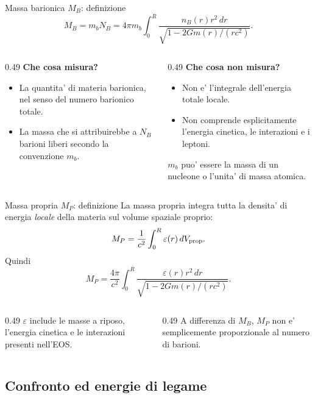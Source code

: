 \begin{frame}{Massa barionica $M_B$: definizione}
\small
\[
M_B=m_bN_B
=4\pi m_b\int_0^R
\frac{n_B(r)r^2\,dr}
{\sqrt{1-2Gm(r)/(rc^2)}}.
\]
\begin{columns}[T,onlytextwidth]
\begin{column}{0.49\textwidth}
\textbf{Che cosa misura?}
\begin{itemize}
\item La quantita' di materia barionica,
nel senso del numero barionico totale.
\item La massa che si attribuirebbe a $N_B$
barioni liberi secondo la convenzione $m_b$.
\end{itemize}
\end{column}
\begin{column}{0.49\textwidth}
\textbf{Che cosa non misura?}
\begin{itemize}
\item Non e' l'integrale dell'energia totale locale.
\item Non comprende esplicitamente
l'energia cinetica, le interazioni e i leptoni.
\end{itemize}
\medskip
$m_b$ puo' essere la massa di un nucleone
o l'unita' di massa atomica.
\end{column}
\end{columns}
\end{frame}

\begin{frame}{Massa propria $M_P$: definizione}
\small
La massa propria integra tutta la densita' di energia
\emph{locale} della materia sul volume spaziale proprio:
\[
M_P=\frac{1}{c^2}\int_0^R\varepsilon(r)\,dV_{\rm prop}.
\]
Quindi
\[
M_P=\frac{4\pi}{c^2}\int_0^R
\frac{\varepsilon(r)r^2\,dr}
{\sqrt{1-2Gm(r)/(rc^2)}}.
\]
\begin{columns}[T,onlytextwidth]
\begin{column}{0.49\textwidth}
$\varepsilon$ include le masse a riposo,
l'energia cinetica e le interazioni
presenti nell'EOS.
\end{column}
\begin{column}{0.49\textwidth}
A differenza di $M_B$, $M_P$ non e'
semplicemente proporzionale al numero
di barioni.
\end{column}
\end{columns}
\end{frame}

\subsection{Confronto ed energie di legame}

